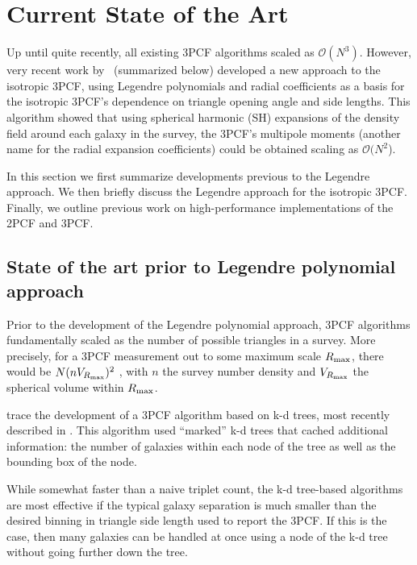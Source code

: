 \section{Current State of the Art}

Up until quite recently, all existing 3PCF algorithms scaled as $\mathcal{O}(N^3)$. However, very recent work by~\cite{SE3ptalg} (summarized below) developed a new approach to the isotropic 3PCF, using Legendre polynomials and radial coefficients as a basis for the isotropic 3PCF's dependence on triangle opening angle and side lengths. This algorithm showed that using spherical harmonic (SH) expansions of the density field around each galaxy in the survey, the 3PCF's multipole moments (another name for the radial expansion coefficients) could be obtained scaling as $\mathcal{O}(N^2$).  


In this section we first summarize developments previous to the Legendre approach. We then briefly discuss the Legendre approach for the isotropic 3PCF.
Finally, we outline previous work on high-performance implementations of the 2PCF and 3PCF.

\subsection{State of the art prior to Legendre polynomial approach}
Prior to the development of the Legendre polynomial approach, 3PCF algorithms \cite{Moore2001, Gray2004, Jarvis2004, Nichol2006, Gardner2007, March2013} fundamentally scaled as the number of possible triangles in a survey. More precisely, for a 3PCF measurement out to some maximum scale $R_{\rm max}$, there would be $N(nV_{R_{\rm max}})^2$ , with $n$ the survey number density and $V_{R_{\rm max}}$ the spherical volume within $R_{\rm max}$. 

\cite{Moore2001, Gray2004, Jarvis2004, Nichol2006, Gardner2007, March2013} trace the development of a 3PCF algorithm based on k-d trees, most recently described in \cite{March2013}. This algorithm used ``marked'' k-d trees that cached additional information: the number of galaxies within each node of the tree as well as the bounding box of the node. 

While somewhat faster than a naive triplet count, the k-d tree-based algorithms are most effective if the typical galaxy separation is much smaller than the desired binning in triangle side length used to report the 3PCF. If this is the case, then many galaxies can be handled at once using a node of the k-d tree without going further down the tree. 

